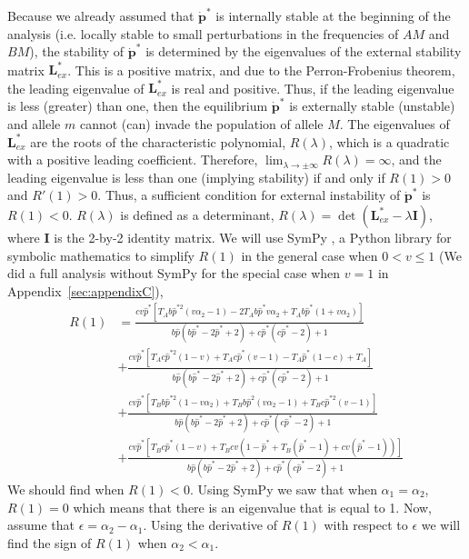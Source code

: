 \documentclass[12pt]{extarticle}
\let\vec\mathbf
\newcommand{\cl}{\mathbf{L}}
\newcommand{\ci}{\mathbf{I}}
\begin{document}
Because we already assumed that $\vec{\dot{p}^*}$ is internally stable at the beginning of the analysis (i.e. locally stable to small perturbations in the frequencies of $AM$ and $BM$), the stability of 
$\vec{\dot{p}^*}$ is determined by the eigenvalues of the external stability matrix $\cl^*_{ex}$.
This is a positive matrix, and due to the Perron-Frobenius theorem, the leading eigenvalue of $\cl^*_{ex}$ is real and positive.
Thus, if the leading eigenvalue is less (greater) than one, then the equilibrium $\vec{\dot{p}^*}$ is externally stable (unstable) and allele $m$ cannot (can) invade the population of allele $M$. 
The eigenvalues of $\cl^*_{ex}$ are the roots of the characteristic polynomial, $R(\lambda)$,
which is a quadratic with a positive leading coefficient. Therefore, $\lim_{\lambda \to \pm \infty} R(\lambda) = \infty$, and the leading eigenvalue is less than one (implying stability) if and only if $R(1)>0$ and $R'(1)>0$.
Thus, a sufficient condition for external instability of $\vec{\dot{p}^*}$ is $R(1) < 0$.
$R(\lambda)$ is defined as a determinant, $R(\lambda)=\det(\cl^*_{ex} - \lambda \ci)$, where $\ci$ is the 2-by-2 identity matrix. 
We will use SymPy \citep{Meurer2017}, a Python library for symbolic mathematics to simplify $R(1)$ in the general case when $0<v\leq 1$ (We did a full analysis without SymPy for the special case when $v=1$ in Appendix~\ref{sec:appendixC}),
\begin{equation} \label{eq:value_at_1}
  \begin{aligned}
  R(1) &= \frac{c v \hat{p}^*[T_Ab\hat{p}^{*2}(v\alpha_2-1)-2T_Ab\hat{p}^*v\alpha_2 + T_Ab\hat{p}^*(1+v\alpha_2)]}{b\hat{p}(b\hat{p}^*-2\hat{p}^*+2)+c\hat{p}^*(c\hat{p}^*-2)+1} \\
 & + \frac{c v \hat{p}^*[T_Ac\hat{p}^{*2}(1-v)+T_Ac\hat{p}^*(v-1)-T_A\hat{p}^*(1-c)+T_A]}{b\hat{p}(b\hat{p}^*-2\hat{p}^*+2)+c\hat{p}^*(c\hat{p}^*-2)+1} \\
  &+ \frac{c v \hat{p}^*[T_Bb\hat{p}^{*2}(1-v\alpha_2)+T_Bb\hat{p}^2(v\alpha_2-1)+T_Bc\hat{p}^{*2}(v-1)]}{b\hat{p}(b\hat{p}^*-2\hat{p}^*+2)+c\hat{p}^*(c\hat{p}^*-2)+1}\\
  &+ \frac{c v \hat{p}^*[T_Bc\hat{p}^*(1-v) + T_Bcv(1-\hat{p}^*+T_B(\hat{p}^*-1)+cv(\hat{p}^*-1))]}{b\hat{p}(b\hat{p}^*-2\hat{p}^*+2)+c\hat{p}^*(c\hat{p}^*-2)+1}
  \end{aligned}
\end{equation}
We should find when $R(1)<0$. Using SymPy we saw that when $\alpha_1=\alpha_2$, $R(1)=0$ which means that there is an eigenvalue that is equal to 1.
Now, assume that $\epsilon = \alpha_2 - \alpha_1$. Using the derivative of $R(1)$ with respect to $\epsilon$ we will find the sign of $R(1)$ when $\alpha_2<\alpha_1$.
\end{document}
